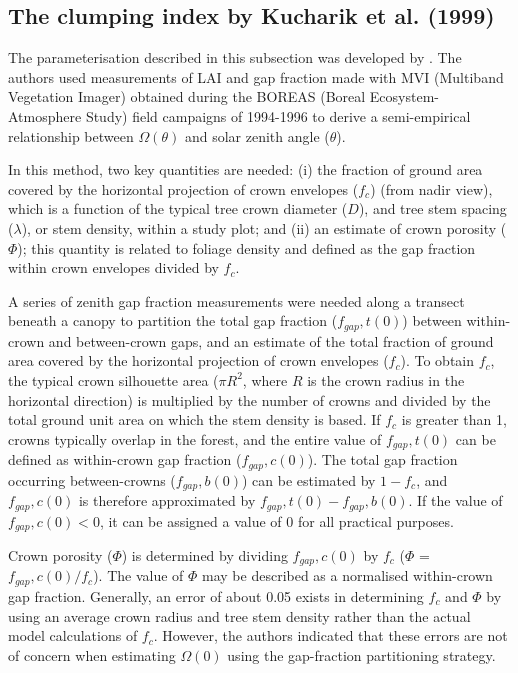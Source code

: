 \subsection{The clumping index by Kucharik et al. (1999)}
The parameterisation described in this subsection was developed by \citet{Kucharik1999}. The authors used measurements of LAI and gap fraction made with MVI (Multiband Vegetation Imager) \citep{Kucharik1997} obtained during the BOREAS (Boreal Ecosystem-Atmosphere Study) \citep{Sellers1997} field campaigns of 1994-1996 to derive a semi-empirical relationship between $\Omega(\theta)$ and solar zenith angle ($\theta$). 

In this method, two key quantities are needed: (i) the fraction of ground area covered by the horizontal projection of crown envelopes ($f_c$) (from nadir view), which is a function of the typical tree crown diameter ($D$), and tree stem spacing ($\lambda$), or stem density, within a study plot; and (ii) an estimate of crown porosity ($\Phi$); this quantity is related to foliage density and defined as the gap fraction within crown envelopes divided by $f_c$.
 
A series of zenith gap fraction measurements were needed along a transect beneath a canopy to partition the total gap fraction ($f_{gap},t(0)$) between within-crown and between-crown gaps, and  an estimate of the total fraction of ground area covered by the horizontal projection of crown envelopes ($f_c$). To obtain $f_c$, the typical crown silhouette area ($\pi R^2$, where $R$ is the crown radius in the horizontal direction) is multiplied by the number of crowns and divided by the total ground unit area on which the stem density is based. If $f_c$ is greater than 1, crowns typically overlap in the forest, and the entire value of $f_{gap},t(0)$ can be defined as within-crown gap fraction ($f_{gap},c(0)$). The total gap fraction occurring between-crowns ($f_{gap},b(0)$) can be estimated by $1 - f_c$, and $f_{gap},c(0)$ is therefore approximated by $f_{gap},t(0) - f_{gap},b(0)$. If the value of $f_{gap},c(0) < 0$, it can be assigned a value of 0 for all practical purposes. 

Crown porosity ($\Phi$) is determined by dividing $f_{gap},c(0)$ by $f_c$ ($\Phi$ = $f_{gap},c(0)/f_c$). The value of $\Phi$ may be described as a normalised within-crown gap fraction. Generally, an error of about 0.05 exists in determining $f_c$ and $\Phi$ by using an average crown radius and tree stem density rather than the actual model calculations of $f_c$. However, the authors indicated that these errors are not of concern when estimating $\Omega(0)$ using the gap-fraction partitioning strategy.

